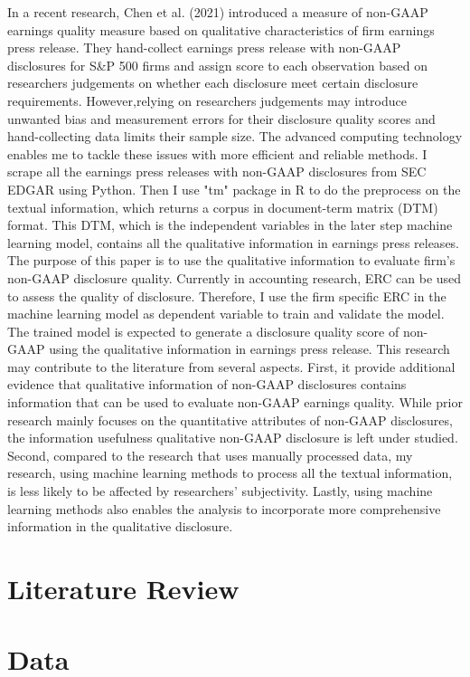\documentclass{article}
\begin{document}
In a recent research, Chen et al. (2021) introduced a measure of non-GAAP earnings quality measure based on qualitative characteristics of firm earnings press release. They hand-collect earnings press release with non-GAAP disclosures for S&P 500 firms and assign score to each observation based on researchers judgements on whether each disclosure meet certain disclosure requirements. However,relying on researchers judgements may introduce unwanted bias and measurement errors for their disclosure quality scores and hand-collecting data limits their sample size. The advanced computing technology enables me to tackle these issues with more efficient and reliable methods. I scrape all the earnings press releases with non-GAAP disclosures from SEC EDGAR using Python. Then I use "tm" package in R to do the preprocess on the textual information, which returns a corpus in document-term matrix (DTM) format. This DTM, which is the independent variables in the later step machine learning model, contains all the qualitative information in earnings press releases. The purpose of this paper is to use the qualitative information to evaluate firm's non-GAAP disclosure quality. Currently in accounting research, ERC can be used to assess the quality of disclosure. Therefore, I use the firm specific ERC in the machine learning model as dependent variable to train and validate the model. The trained model is expected to generate a disclosure quality score of non-GAAP using the qualitative information in earnings press release. 
This research may contribute to the literature from several aspects. First, it provide additional evidence that qualitative information of non-GAAP disclosures contains information that can be used to evaluate non-GAAP earnings quality. While prior research mainly focuses on the quantitative attributes of non-GAAP disclosures, the information usefulness qualitative non-GAAP disclosure is left under studied. Second, compared to the research that uses manually processed data, my research, using machine learning methods to process all the textual information, is less likely to be affected by researchers' subjectivity. Lastly, using machine learning methods also enables the analysis to incorporate more comprehensive information in the qualitative disclosure. 

\section{Literature Review}

\section{Data}
\end{document}
